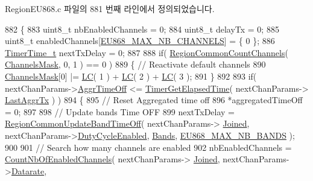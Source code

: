 Region\+E\+U868.\+c 파일의 881 번째 라인에서 정의되었습니다.


\begin{DoxyCode}
882 \{
883     uint8\_t nbEnabledChannels = 0;
884     uint8\_t delayTx = 0;
885     uint8\_t enabledChannels[\mbox{\hyperlink{group___r_e_g_i_o_n_e_u868_gaf94c3090ac541fec3c97b2146702d252}{EU868\_MAX\_NB\_CHANNELS}}] = \{ 0 \};
886     \mbox{\hyperlink{utilities_8h_a4215ca43d3e953099ea758ce428599d0}{TimerTime\_t}} nextTxDelay = 0;
887 
888     \textcolor{keywordflow}{if}( \mbox{\hyperlink{group___r_e_g_i_o_n_c_o_m_m_o_n_gac23f0831812f610f57f42f6cf87368c9}{RegionCommonCountChannels}}( \mbox{\hyperlink{_region_e_u868_8c_a2188957b5ca6af8092154d7ccbfa5757}{ChannelsMask}}, 0, 1 ) == 0 )
889     \{ \textcolor{comment}{// Reactivate default channels}
890         \mbox{\hyperlink{_region_e_u868_8c_a2188957b5ca6af8092154d7ccbfa5757}{ChannelsMask}}[0] |= \mbox{\hyperlink{group___r_e_g_i_o_n_ga12fa17e5c1016e01a9d82c25027deb1b}{LC}}( 1 ) + \mbox{\hyperlink{group___r_e_g_i_o_n_ga12fa17e5c1016e01a9d82c25027deb1b}{LC}}( 2 ) + \mbox{\hyperlink{group___r_e_g_i_o_n_ga12fa17e5c1016e01a9d82c25027deb1b}{LC}}( 3 );
891     \}
892 
893     \textcolor{keywordflow}{if}( nextChanParams->\mbox{\hyperlink{structs_next_chan_params_a3609676d2d3b7c00e25615324b35cb26}{AggrTimeOff}} <= \mbox{\hyperlink{time_server_8c_a9ca7e27f3d6474daff63f2e093a2e91e}{TimerGetElapsedTime}}( nextChanParams->
      \mbox{\hyperlink{structs_next_chan_params_a381b728f60b185ecf3313e974c18768b}{LastAggrTx}} ) )
894     \{
895         \textcolor{comment}{// Reset Aggregated time off}
896         *aggregatedTimeOff = 0;
897 
898         \textcolor{comment}{// Update bands Time OFF}
899         nextTxDelay = \mbox{\hyperlink{group___r_e_g_i_o_n_c_o_m_m_o_n_ga2e26fe6b49ca26edf7052eadd7f18b3a}{RegionCommonUpdateBandTimeOff}}( nextChanParams->
      \mbox{\hyperlink{structs_next_chan_params_ac2f6caa0f3b02d2ac5056c3ee7c22652}{Joined}}, nextChanParams->\mbox{\hyperlink{structs_next_chan_params_a4d755868e0e80089462286c3ba6a6f18}{DutyCycleEnabled}}, \mbox{\hyperlink{_region_e_u868_8c_a47eef5d43d561ee2fcab661437818ae3}{Bands}}, 
      \mbox{\hyperlink{group___r_e_g_i_o_n_e_u868_gac5749114ab11499796ef455491fe8997}{EU868\_MAX\_NB\_BANDS}} );
900 
901         \textcolor{comment}{// Search how many channels are enabled}
902         nbEnabledChannels = \mbox{\hyperlink{_region_e_u868_8c_a84ed01aa0ea6f1e53707efb5aaa3bd97}{CountNbOfEnabledChannels}}( nextChanParams->
      \mbox{\hyperlink{structs_next_chan_params_ac2f6caa0f3b02d2ac5056c3ee7c22652}{Joined}}, nextChanParams->\mbox{\hyperlink{structs_next_chan_params_ae2f6080f3aa0e9485c55513ca56bb24d}{Datarate}},

\end{DoxyCode}

